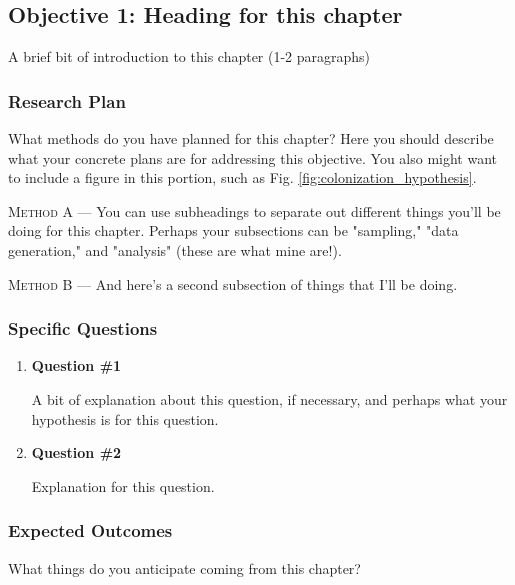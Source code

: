 \subsection{Objective 1: Heading for this chapter}
\label{objective1}
A brief bit of introduction to this chapter (1-2 paragraphs)

\subsubsection{Research Plan}
 What methods do you have planned for this chapter? Here you should describe what your concrete plans are for addressing this objective. You also might want to include a figure in this portion, such as Fig. \ref{fig:colonization_hypothesis}.
 
 
 
 \textsc{Method A ---} You can use subheadings to separate out different things you'll be doing for this chapter. Perhaps your subsections can be "sampling," "data generation," and "analysis" (these are what mine are!).
 
 \textsc{Method B ---} And here's a second subsection of things that I'll be doing.
 
\subsubsection{Specific Questions}
\begin{enumerate}
    \item \textbf{Question \#1}
    
    A bit of explanation about this question, if necessary, and perhaps what your hypothesis is for this question.
    
    \item \textbf{Question \#2}
    
    Explanation for this question.
    
\end{enumerate}

\subsubsection{Expected Outcomes}
What things do you anticipate coming from this chapter?